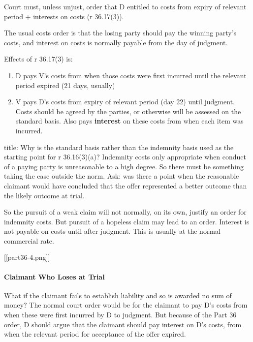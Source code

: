 \documentclass[
]{article}
\newenvironment{Shaded}{}{}
\newcommand{\NormalTok}[1]{#1}
\providecommand{\tightlist}{%
  \setlength{\itemsep}{0pt}\setlength{\parskip}{0pt}}
\begin{document}
Court must, unless unjust, order that D entitled to costs from expiry of
relevant period + interests on costs (r 36.17(3)).

The usual costs order is that the losing party should pay the winning
party's costs, and interest on costs is normally payable from the day of
judgment.

Effects of r 36.17(3) is:

\begin{enumerate}
\def\labelenumi{\arabic{enumi}.}
\tightlist
\item
  D pays V's costs from when those costs were first incurred until the
  relevant period expired (21 days, usually)
\item
  V pays D's costs from expiry of relevant period (day 22) until
  judgment. Costs should be agreed by the parties, or otherwise will be
  assessed on the standard basis. Also pays \textbf{interest} on these
  costs from when each item was incurred.
\end{enumerate}

\begin{Shaded}
\begin{Highlighting}[]
\NormalTok{title: Why is the standard basis rather than the indemnity basis used as the starting point for r 36.16(3)(a)?}
\NormalTok{Indemnity costs only appropriate when conduct of a paying party is unreasonable to a high degree. So there must be something taking the case outside the norm. Ask: was there a point when the reasonable claimant would have concluded that the offer represented a better outcome than the likely outcome at trial. }
\end{Highlighting}
\end{Shaded}

So the pursuit of a weak claim will not normally, on its own, justify an
order for indemnity costs. But pursuit of a hopeless claim may lead to
an order. Interest is not payable on costs until after judgment. This is
usually at the normal commercial rate.

{[}{[}part36-4.png{]}{]}

\hypertarget{claimant-who-loses-at-trial}{%
\paragraph{Claimant Who Loses at
Trial}\label{claimant-who-loses-at-trial}}

What if the claimant fails to establish liability and so is awarded no
sum of money? The normal court order would be for the claimant to pay
D's costs from when these were first incurred by D to judgment. But
because of the Part 36 order, D should argue that the claimant should
pay interest on D's costs, from when the relevant period for acceptance
of the offer expired.
\end{document}
